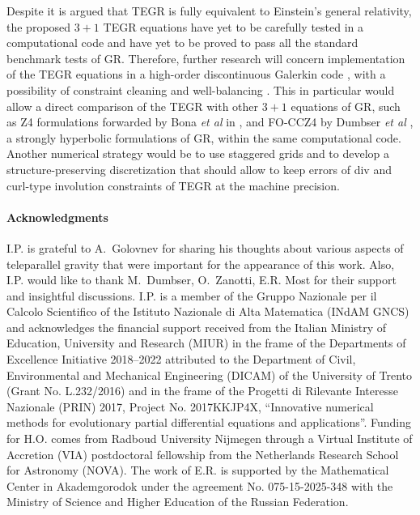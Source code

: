 \documentclass[
10pt, %
a4paper, %
oneside, %
twocolumn,
headinclude,footinclude, %
BCOR5mm, %
]{scrartcl}
\begin{document}
	Despite it is argued that TEGR is fully equivalent to Einstein's general relativity, the 
	proposed $ 3+1 $ TEGR equations have yet to be carefully tested in a computational code and 
	have 
	yet to be proved to pass all the standard benchmark tests of GR. Therefore, further research 
	will 
	concern implementation of the TEGR equations in a high-order discontinuous Galerkin code 
	\cite{Dumbser2018a,Busto2020}, with a possibility of constraint cleaning  \cite{Dumbser2019} 
	and 
	well-balancing 
	\cite{Gaburro2021}. This in particular would allow a direct comparison of the TEGR with other $ 
	3+1 
	$ equations of GR, such as Z4 formulations \cite{Alic2012} forwarded by Bona \textit{et al} in 
	\cite{Z4}, and FO-CCZ4 by 
	Dumbser \textit{et al} \cite{FO-CCZ4}, a
	strongly hyperbolic formulations of GR, within the same computational code.  Another 
	numerical 
	strategy would be to use staggered grids and to develop a
	structure-preserving discretization \cite{SIGPR2021,Olivares2022,Fambri2020a} that should allow 
	to 
	keep errors of div and curl-type involution constraints of TEGR at the machine precision.
	
	
	\paragraph{Acknowledgments}
	I.P. is grateful to A.~Golovnev for sharing his thoughts about various
	aspects of teleparallel gravity that were important for the appearance of
	this work. Also, I.P. would like to thank M.~Dumbser, O.~Zanotti, E.R. Most
	for their support and insightful discussions. I.P. is a member of the Gruppo
	Nazionale per il Calcolo Scientifico of the Istituto Nazionale di Alta
	Matematica (INdAM GNCS) and acknowledges the financial support received from
	the Italian Ministry of Education, University and Research (MIUR) in the
	frame of the Departments of Excellence Initiative 2018–2022 attributed to
	the Department of Civil, Environmental and Mechanical Engineering (DICAM) of
	the University of Trento (Grant No. L.232/2016) and in the frame of the
	Progetti di Rilevante Interesse Nazionale (PRIN) 2017, Project No.
	2017KKJP4X, “Innovative numerical methods for evolutionary partial
	differential equations and applications”.
	Funding for H.O. comes from Radboud University Nijmegen through a Virtual
	Institute of Accretion (VIA) postdoctoral fellowship from the Netherlands
	Research School for Astronomy (NOVA).
	The work of E.R. is supported by the Mathematical Center in Akademgorodok
	under the agreement No. 075-15-2025-348 with the Ministry of Science and
	Higher Education of the Russian Federation.
	
\end{document}
